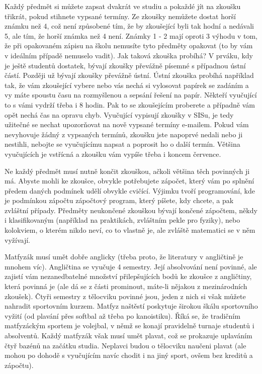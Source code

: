 Každý předmět si můžete zapsat dvakrát ve studiu a pokaždé jít na zkoušku
třikrát, pokud stihnete vypsané termíny.
Ze zkoušky nemůžete dostat horší známku než 4, což není způsobené tím, že by
zkoušející byli tak hodní a nedávali 5, ale tím, že horší známka než 4 není.
Známky 1 - 2 mají oproti 3 výhodu v tom, že při opakovaném zápisu na školu
nemusíte tyto předměty opakovat (to by vám v ideálním případě nemuselo vadit).
Jak taková zkouška probíhá? V prváku, kdy je ještě studentů dostatek, bývají
zkoušky převážně písemné s případnou ústní částí. Později už bývají zkoušky
převážně ústní. Ústní zkouška probíhá například tak, že vám zkoušející vybere
nebo vás nechá si vylosovat papírek se zadáním a vy máte spoustu času na
rozmyšlenou a sepsání řešení na papír. Někteří vyučující to s vámi vydrží třeba
i 8 hodin. Pak to se zkoušejícím proberete a případně vám opět nechá čas na
opravu chyb.
Vyučující vypisují zkoušky v SISu, je tedy užitečné se nechat upozorňovat na
nově vypsané termíny e-mailem. Pokud vám nevyhovuje žádný z vypsaných termínů,
zkoušku jste napoprvé nedali nebo ji nestihli, nebojte se vyučujícímu napsat a
poprosit ho o další termín. Většina vyučujících je vstřícná a zkoušku vám vypíše
třeba i koncem července.

Ne každý předmět musí nutně končit zkouškou, ačkoli většina těch povinných ji
má. Abyste mohli ke zkoušce, obvykle potřebujete zápočet, který vám po splnění
předem daných podmínek udělí obvykle cvičící. Výjimku tvoří programování, kde je
podmínkou zápočtu zápočtový program, který píšete, kdy chcete, a pak zvláštní
případy. Předměty neukončené zkouškou bývají končené zápočtem, někdy i
klasifikovaným (například na praktikách, zvláštním pekle pro fyziky), nebo
kolokviem, o kterém nikdo neví, co to vlastně je, ale zvláště matematici se v
něm vyžívají.

Matfyzák musí umět dobře anglicky (třeba proto, že literatury v angličtině je
mnohem víc). Angličtina se vyučuje 4 semestry. Její absolvování není povinné,
ale zajistí vám nezanedbatelné množství přilepšujících bodů ke zkoušce z
angličtiny, která povinná je (ale dá se z části prominout, máte-li nějakou z
mezinárodních zkoušek).
Čtyři semestry z tělocviku povinné jsou, jeden z nich si však můžete nahradit
sportovním kurzem. Matfyz naštěstí poskytuje širokou škálu sportovního vyžití
(od plavání přes softbal až třeba po kanoistiku). Říká se, že tradičním
matfyzáckým sportem je volejbal, v němž se konají pravidelně turnaje studentů i
absolventů.
Každý matfyzák však musí umět plavat, což se prokazuje uplaváním čtyř bazénů na
začátku studia. Neplavci budou o tělocviku naučeni plavat (ale mohou po dohodě s
vyučujícím navíc chodit i na jiný sport, ovšem bez kreditů a zápočtu).

